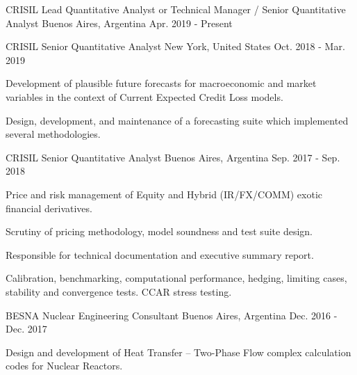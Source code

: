 
\begin{cventries}

  \cventry
    {CRISIL}
    {Lead Quantitative Analyst or Technical Manager / Senior Quantitative Analyst}
    {Buenos Aires, Argentina}
    {Apr. 2019 - Present}
    {
      \begin{cvitems}
        \item{}
      \end{cvitems}
      \vspace{1em}
    }

  \cventry
    {CRISIL}
    {Senior Quantitative Analyst}
    {New York, United States}
    {Oct. 2018 - Mar. 2019}
    {
      \begin{cvitems}
        \item{Development of plausible future forecasts for macroeconomic and market variables in the context of Current Expected Credit Loss models.}
        \item{Design, development, and maintenance of a forecasting suite which implemented several methodologies.}
      \end{cvitems}
      \vspace{1em}
    }

  \cventry
    {CRISIL}
    {Senior Quantitative Analyst}
    {Buenos Aires, Argentina}
    {Sep. 2017 - Sep. 2018}
    {
      \begin{cvitems}
        \item{Price and risk management of Equity and Hybrid (IR/FX/COMM) exotic financial derivatives.}
        \item{Scrutiny of pricing methodology, model soundness and test suite design.}
        \item{Responsible for technical documentation and executive summary report.}
        \item{Calibration, benchmarking, computational performance, hedging, limiting cases, stability and convergence tests. CCAR stress testing.}
      \end{cvitems}
      \vspace{1em}
    }

  \cventry
    {BESNA}
    {Nuclear Engineering Consultant}
    {Buenos Aires, Argentina}
    {Dec. 2016 - Dec. 2017}
    {
      \begin{cvitems}
        \item{Design and development of Heat Transfer – Two-Phase Flow complex calculation codes for Nuclear Reactors.}
      \end{cvitems}
      \vspace{1em}
    }


\end{cventries}
